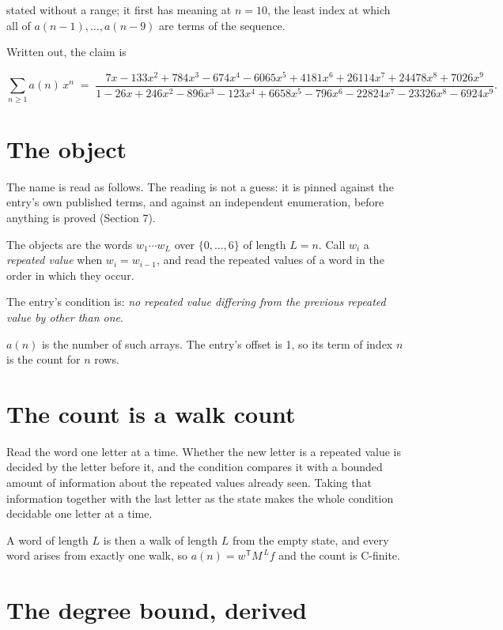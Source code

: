 \documentclass[11pt]{article}
\theoremstyle{definition}
\begin{document}
stated without a range; it first has meaning at $n = 10$, the least index at which all of $a(n-1),\dots,a(n-9)$ are terms of the sequence.

Written out, the claim is

\[\sum_{n \ge 1} a(n)\,x^n \;=\; \frac{7x - 133x^{2} + 784x^{3} - 674x^{4} - 6065x^{5} + 4181x^{6} + 26114x^{7} + 24478x^{8} + 7026x^{9}}{1 - 26x + 246x^{2} - 896x^{3} - 123x^{4} + 6658x^{5} - 796x^{6} - 22824x^{7} - 23326x^{8} - 6924x^{9}}.\]

\section{The object}

The name is read as follows. The reading is not a guess: it is pinned against the entry's own published terms, and against an independent enumeration, before anything is proved (Section 7).

The objects are the words $w_1\cdots w_L$ over $\{0,\dots,6\}$ of length $L = n$. Call $w_i$ a {\itshape repeated value} when $w_i = w_{i-1}$, and read the repeated values of a word in the order in which they occur.

The entry's condition is: {\itshape no repeated value differing from the previous repeated value by other than one}.

$a(n)$ is the number of such arrays. The entry's offset is 1, so its term of index $n$ is the count for $n$ rows.

\section{The count is a walk count}

Read the word one letter at a time. Whether the new letter is a repeated value is decided by the letter before it, and the condition compares it with a bounded amount of information about the repeated values already seen. Taking that information together with the last letter as the state makes the whole condition decidable one letter at a time.

A word of length $L$ is then a walk of length $L$ from the empty state, and every word arises from exactly one walk, so $a(n) = w^{\mathsf T}M^{\,L}f$ and the count is C-finite.

\section{The degree bound, derived}
\end{document}
